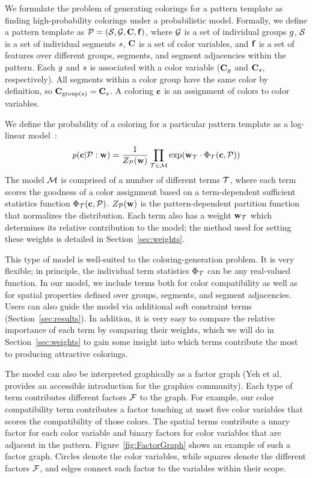 
We formulate the problem of generating colorings for a pattern template as finding high-probability colorings under a probabilistic model. Formally, we define a pattern template as $\mathcal{P} = (\mathcal{S}, \mathcal{G}, \mathbf{C}, \mathbf{f})$, where $\mathcal{G}$ is a set of individual groups $g$, $\mathcal{S}$ is a set of individual segments $s$, $\mathbf{C}$ is a set of color variables, and $\mathbf{f}$ is a set of features over different groups, segments, and segment adjacencies within the pattern. Each $g$ and $s$ is associated with a color variable ($\mathbf{C}_g$ and $\mathbf{C}_s$, respectively). All segments within a color group have the same color by definition, so $\mathbf{C}_{\text{group}(s)} = \mathbf{C}_s$. A coloring $\mathbf{c}$ is an assignment of colors to color variables.

We define the probability of a coloring for a particular pattern template as a log-linear model~\cite{LogLinearModels}:  
\begin{equation*}
 p(\mathbf{c} | \mathcal{P} : \mathbf{w}) = \frac{1}{Z_{\mathcal{P}}(\mathbf{w})} \prod_{\mathcal{T} \in \mathcal{M}} \exp(\mathbf{w}_{\mathcal{T}} \cdot \Phi_{\mathcal{T}}(\mathbf{c}, \mathcal{P}))
\end{equation*}
The model $\mathcal{M}$ is comprised of a number of different terms $\mathcal{T}$, where each term scores the goodness of a color assignment based on a term-dependent sufficient statistics function $\Phi_{\mathcal{T}}(\mathbf{c},\mathcal{P})$. $Z_{\mathcal{P}}(\mathbf{w})$ is the pattern-dependent partition function that normalizes the distribution. Each term also has a weight $\mathbf{w}_{\mathcal{T}}$ which determines its relative contribution to the model; the method used for setting these weights is detailed in Section~\ref{sec:weights}.

This type of model is well-suited to the coloring-generation problem. It is very flexible; in principle, the individual term statistics $\Phi_{\mathcal{T}}$ can be any real-valued function. In our model, we include terms both for color compatibility as well as for spatial properties defined over groups, segments, and segment adjacencies. Users can also guide the model via additional soft constraint terms (Section~\ref{sec:results}). In addition, it is very easy to compare the relative importance of each term by comparing their weights, which we will do in Section~\ref{sec:weights} to gain some insight into which terms contribute the most to producing attractive colorings. 

The model can also be interpreted graphically as a factor graph (Yeh et al.~ provides an accessible introduction for the graphics community). Each type of term contributes different factors $\mathcal{F}$ to the graph. For example, our color compatibility term contributes a factor touching at most five color variables that scores the compatibility of those colors. The spatial terms contribute a unary factor for each color variable and binary factors for color variables that are adjacent in the pattern. Figure~\ref{fig:FactorGraph} shows an example of such a factor graph. Circles denote the color variables, while squares denote the different factors $\mathcal{F}$, and edges connect each factor to the variables within their scope. 


